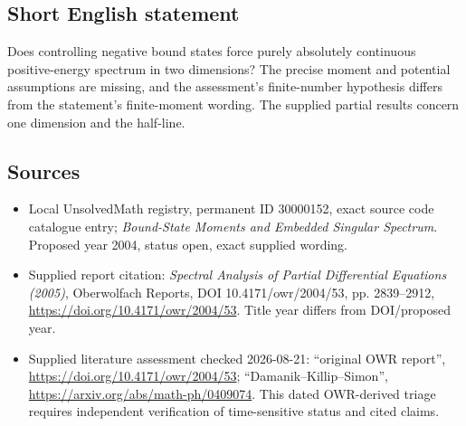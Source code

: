 \documentclass[11pt]{article}
\begin{document}
\subsection{Short English statement}
Does controlling negative bound states force purely absolutely continuous positive-energy spectrum in two dimensions? The precise moment and potential assumptions are missing, and the assessment's finite-number hypothesis differs from the statement's finite-moment wording. The supplied partial results concern one dimension and the half-line.
\subsection{Sources}
\begin{itemize}
\item Local UnsolvedMath registry, permanent ID 30000152, exact source code catalogue entry; \emph{Bound-State Moments and Embedded Singular Spectrum}. Proposed year 2004, status open, exact supplied wording.
\item Supplied report citation: \emph{Spectral Analysis of Partial Differential Equations (2005)}, Oberwolfach Reports, DOI 10.4171/owr/2004/53, pp. 2839--2912, \url{https://doi.org/10.4171/owr/2004/53}. Title year differs from DOI/proposed year.
\item Supplied literature assessment checked 2026-08-21: ``original OWR report'', \url{https://doi.org/10.4171/owr/2004/53}; ``Damanik--Killip--Simon'', \url{https://arxiv.org/abs/math-ph/0409074}. This dated OWR-derived triage requires independent verification of time-sensitive status and cited claims.
\end{itemize}
\end{document}
